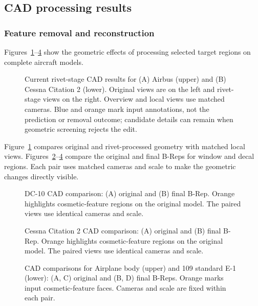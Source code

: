 \documentclass[12pt,a4paper]{article}
\begin{document}
\FloatBarrier

\subsection{CAD processing results}\label{sec:e2_results}

\subsubsection{Feature removal and reconstruction}

Figures~\ref{fig:e2_rivet_examples}--\ref{fig:e2_decal_109} show the geometric effects of processing selected target regions on complete aircraft models.

\begin{figure}[!htp]
\centering
\singlespacing
\captionsetup{font=small,skip=3pt}
\centering
\par\vspace{3mm}
\centering
\caption{Current rivet-stage CAD results for (A) Airbus (upper) and (B) Cessna Citation 2 (lower). Original views are on the left and rivet-stage views on the right. Overview and local views use matched cameras. Blue and orange mark input annotations, not the prediction or removal outcome; candidate details can remain when geometric screening rejects the edit.}\label{fig:e2_rivet_examples}
\end{figure}

Figure~\ref{fig:e2_rivet_examples} compares original and rivet-processed geometry with matched local views. Figures~\ref{fig:e2_window_examples}--\ref{fig:e2_decal_109} compare the original and final B-Reps for window and decal regions. Each pair uses matched cameras and scale to make the geometric changes directly visible.

\begin{figure}[!htp]
\centering
\captionsetup{font=small,skip=3pt}

\caption{DC-10 CAD comparison: (A) original and (B) final B-Rep. Orange highlights cosmetic-feature regions on the original model. The paired views use identical cameras and scale.}\label{fig:e2_window_examples}
\end{figure}
\begin{figure}[!htp]
\centering
\captionsetup{font=small,skip=3pt}

\caption{Cessna Citation 2 CAD comparison: (A) original and (B) final B-Rep. Orange highlights cosmetic-feature regions on the original model. The paired views use identical cameras and scale.}\label{fig:e2_window_cessna}
\end{figure}
\begin{figure}[!htp]
\centering
\captionsetup{font=small,skip=3pt}

\caption{CAD comparisons for Airplane body (upper) and 109 standard E-1 (lower): (A, C) original and (B, D) final B-Reps. Orange marks input cosmetic-feature faces. Cameras and scale are fixed within each pair.}\label{fig:e2_decal_109}
\end{figure}
\FloatBarrier
\end{document}
